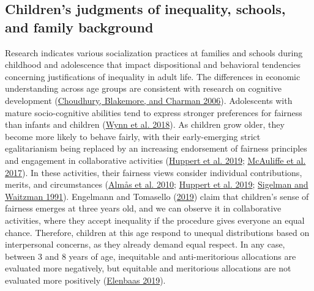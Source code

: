 \documentclass[
  letterpaper,
  DIV=11,
  numbers=noendperiod]{scrartcl}
\begin{document}
\hypertarget{childrens-judgments-of-inequality-schools-and-family-background}{%
\subsection{Children's judgments of inequality, schools, and family
background}\label{childrens-judgments-of-inequality-schools-and-family-background}}

Research indicates various socialization practices at families and
schools during childhood and adolescence that impact dispositional and
behavioral tendencies concerning justifications of inequality in adult
life. The differences in economic understanding across age groups are
consistent with research on cognitive development
(\protect\hyperlink{ref-choudhury_social_2006}{Choudhury, Blakemore, and
Charman 2006}). Adolescents with mature socio-cognitive abilities tend
to express stronger preferences for fairness than infants and children
(\protect\hyperlink{ref-wynn_not_2018}{Wynn et al. 2018}). As children
grow older, they become more likely to behave fairly, with their
early-emerging strict egalitarianism being replaced by an increasing
endorsement of fairness principles and engagement in collaborative
activities (\protect\hyperlink{ref-huppert_development_2019}{Huppert et
al. 2019};
\protect\hyperlink{ref-mcauliffe_developmental_2017}{McAuliffe et al.
2017}). In these activities, their fairness views consider individual
contributions, merits, and circumstances
(\protect\hyperlink{ref-almas_fairness_2010}{Almås et al. 2010};
\protect\hyperlink{ref-huppert_development_2019}{Huppert et al. 2019};
\protect\hyperlink{ref-sigelman_development_1991}{Sigelman and Waitzman
1991}). Engelmann and Tomasello
(\protect\hyperlink{ref-engelmann_children_2019}{2019}) claim that
children's sense of fairness emerges at three years old, and we can
observe it in collaborative activities, where they accept inequality if
the procedure gives everyone an equal chance. Therefore, children at
this age respond to unequal distributions based on interpersonal
concerns, as they already demand equal respect. In any case, between 3
and 8 years of age, inequitable and anti-meritorious allocations are
evaluated more negatively, but equitable and meritorious allocations are
not evaluated more positively
(\protect\hyperlink{ref-elenbaas_unfairness_2019}{Elenbaas 2019}).
\end{document}
